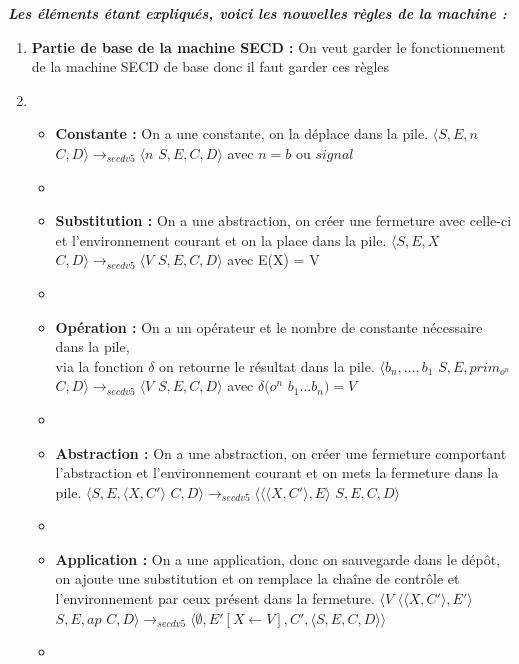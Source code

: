 \documentclass[10pt,a4paper]{article}
\begin{document}
				\textbf{\textit{Les éléments étant expliqués, voici les nouvelles règles de la machine :}}
				\smallbreak
				\begin{enumerate}
					\item[] \textbf{Partie de base de la machine SECD :} On veut garder le fonctionnement de la machine SECD de base donc il faut garder ces règles 
					\item[]
					\begin{itemize}
						\item[] \textbf{Constante :} On a une constante, on la déplace dans la pile.
						\smallbreak
						$\langle S,E,n$ $C,D\rangle 
						\longrightarrow_{secdv5} 
						\langle n$ $S,E,C,D\rangle$ avec $n = b$ ou $signal$
						\item[]
						
						\item[] \textbf{Substitution :} On a une abstraction, on créer une fermeture avec celle-ci et l'environnement courant et on la place dans la pile.
						\smallbreak
						$\langle S,E,X$ $C,D\rangle
						\longrightarrow_{secdv5} 
						\langle V$ $S,E,C,D\rangle$ avec E(X) = V
						\item[]
						
						\item[] \textbf{Opération :} On a un opérateur et le nombre de constante nécessaire dans la pile, \\via la fonction $\delta$ on retourne le résultat dans la pile.
						\smallbreak
						$\langle b_{n},...,b_{1}$ $S,E,prim_{o^{n}}$ $C,D\rangle
						\longrightarrow_{secdv5} 
						\langle V$ $S,E,C,D\rangle$ avec $\delta(o^{n}$ $b_{1}...b_{n}) = V$
						\item[]
						
						\item[]  \textbf{Abstraction :} On a une abstraction, on créer une fermeture comportant l'abstraction et l'environnement courant et on mets la fermeture dans la pile.
						\smallbreak
						$\langle S,E,\langle X,C'\rangle$ $C,D\rangle
						\longrightarrow_{secdv5} 
						\langle \langle\langle X,C'\rangle,E\rangle$ $S,E,C,D\rangle$
						\item[]
						
						\item[]  \textbf{Application :} On a une application, donc on sauvegarde dans le dépôt, on ajoute une substitution et on remplace la chaîne de contrôle et l'environnement par ceux présent dans la fermeture.
						\smallbreak
						$\langle V$ $\langle\langle X,C'\rangle,E'\rangle$ $S,E,ap$ $C,D\rangle
						\longrightarrow_{secdv5} 
						\langle \emptyset,E'[X \leftarrow V],C',\langle S,E,C,D\rangle\rangle$
						\item[] 
						

\end{itemize}
\end{enumerate}
\end{document}

